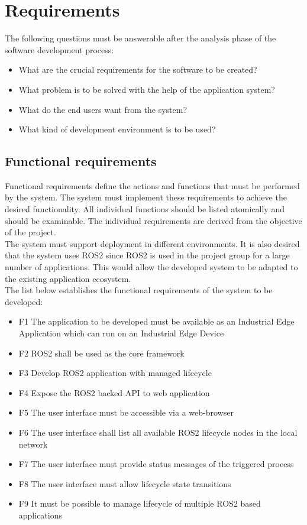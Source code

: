 	\section{Requirements}
	The following questions must be answerable after the analysis phase of the software development process:
	\begin{itemize}
		\item What are the crucial requirements for the software to be created?
		\item What problem is to be solved with the help of the application system?
		\item What do the end users want from the system?
		\item What kind of development environment is to be used?
	\end{itemize}

\subsection{Functional requirements}
Functional requirements define the actions and functions that must be performed by the system. The system must implement these requirements to achieve the desired functionality. All individual functions should be listed atomically and should be examinable. The individual requirements are derived from the objective of the project.\\ 

The system must support deployment in different environments. It is also desired that the system uses ROS2 since ROS2 is used in the project group for a large number of applications. This would allow the developed system to be adapted to the existing application ecosystem.\\

The list below establishes the functional requirements of the system to be developed:
\begin{itemize}
	\item 	F1 The application to be developed must be available as an Industrial Edge Application which can run on an Industrial Edge Device
	\item 	F2 ROS2 shall be used as the core framework
	\item  	F3 Develop ROS2 application with managed lifecycle
	\item 	F4 Expose the ROS2 backed API to web application
	\item 	F5 The user interface must be accessible via a web-browser
	\item 	F6 The user interface shall list all available ROS2 lifecycle nodes in the local network
	\item 	F7  The user interface must provide status messages of the triggered process
	\item 	F8 The user interface must allow lifecycle state transitions
	\item 	F9 It must be possible to manage lifecycle of multiple ROS2 based applications 
\end{itemize}


